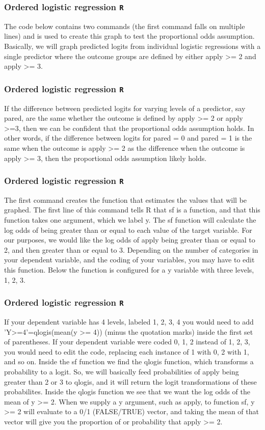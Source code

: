 \documentclass[00-GLMregslides.tex]{subfiles}
\begin{document}
\begin{frame}[fragile]
	\frametitle{Ordered logistic regression \texttt{R} }
	\Large
		
The code below contains two commands (the first command falls on multiple lines) and is used to create this graph to test the proportional odds assumption. Basically, we will graph predicted logits from individual logistic regressions with a single predictor where the outcome groups are defined by either apply >= 2 and apply >= 3. 
\end{frame}
\begin{frame}[fragile]
	\frametitle{Ordered logistic regression \texttt{R} }
	\Large
	If the difference between predicted logits for varying levels of a predictor, say pared, are the same whether the outcome is defined by apply >= 2 or apply >=3, then we can be confident that the proportional odds assumption holds. In other words, if the difference between logits for pared = 0 and pared = 1 is the same when the outcome is apply >= 2 as the difference when the outcome is apply >= 3, then the proportional odds assumption likely holds.
\end{frame}
\begin{frame}[fragile]
	\frametitle{Ordered logistic regression \texttt{R} }
	\Large
The first command creates the function that estimates the values that will be graphed. The first line of this command tells R that sf is a function, and that this function takes one argument, which we label y. The sf function will calculate the log odds of being greater than or equal to each value of the target variable. For our purposes, we would like the log odds of apply being greater than or equal to 2, and then greater than or equal to 3. Depending on the number of categories in your dependent variable, and the coding of your variables, you may have to edit this function. Below the function is configured for a y variable with three levels, 1, 2, 3. \end{frame}
\begin{frame}[fragile]
	\frametitle{Ordered logistic regression \texttt{R} }
	\Large
	If your dependent variable has 4 levels, labeled 1, 2, 3, 4 you would need to add 'Y>=4'=qlogis(mean(y >= 4)) (minus the quotation marks) inside the first set of parentheses. If your dependent variable were coded 0, 1, 2 instead of 1, 2, 3, you would need to edit the code, replacing each instance of 1 with 0, 2 with 1, and so on. Inside the sf function we find the qlogis function, which transforms a probability to a logit. So, we will basically feed probabilities of apply being greater than 2 or 3 to qlogis, and it will return the logit transformations of these probabilites. Inside the qlogis function we see that we want the log odds of the mean of y >= 2. When we supply a y argument, such as apply, to function sf, y >= 2 will evaluate to a 0/1 (FALSE/TRUE) vector, and taking the mean of that vector will give you the proportion of or probability that apply >= 2.
\end{frame}
\end{document}
